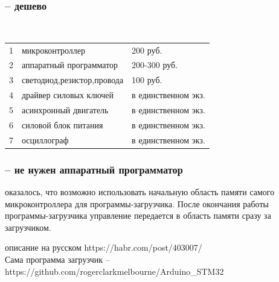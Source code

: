 \documentclass[14pt]{beamer}
\begin{document}
\begin{frame}
\frametitle{ -- дешево} 
\begin{figure}
\begin{center}
\begin{minipage}[h]{0.5\linewidth}
  \\
\end{minipage}
\end{center}
\end{figure} 
\begin{tabular}{lll}
	1&микроконтроллер		&200 руб.\\
	2&аппаратный программатор	&200-300 руб.\\
	3&светодиод,резистор,провода&100 руб.\\
	4&драйвер силовых ключей&в единственном экз.\\
	5&асинхронный двигатель&в единственном экз.\\
	6&силовой блок питания&в единственном экз.\\
	7&осциллограф&в единственном экз.
\end{tabular}
\end{frame}


\begin{frame}
\frametitle{ -- не нужен аппаратный программатор}
оказалось, что возможно использовать начальную область памяти самого микроконтроллера для программы-загрузчика. После окончания работы программы-загрузчика управление
передается в область памяти сразу за загрузчиком.
	\vspace{0.5cm}

описание на русском https://habr.com/post/403007/\\

	Сама  программа загрузчик -- \\
{\small https://github.com/rogerclarkmelbourne/Arduino\_STM32} 
\end{frame}
\end{document}
